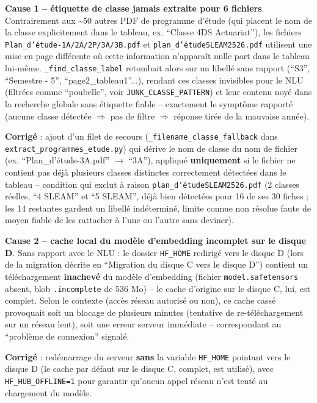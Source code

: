 \documentclass[11pt,a4paper]{report}
\begin{document}
\textbf{Cause 1 -- étiquette de classe jamais extraite pour 6 fichiers}.
Contrairement aux \textasciitilde50 autres PDF de programme d'étude (qui
placent le nom de la classe explicitement dans le tableau, ex. ``Classe 4DS
Actuariat''), les fichiers \texttt{Plan\_d'étude-1A/2A/2P/3A/3B.pdf} et
\texttt{plan\_d'étudeSLEAM2526.pdf} utilisent une mise en page différente où
cette information n'apparaît nulle part dans le tableau lui-même.
\texttt{\_find\_classe\_label} retombait alors sur un libellé sans rapport
(``S3'', ``Semestre - 5'', ``page2\_tableau1''...), rendant ces classes
invisibles pour le NLU (filtrées comme ``poubelle'', voir
\texttt{JUNK\_CLASSE\_PATTERN}) et leur contenu noyé dans la recherche globale
sans étiquette fiable -- exactement le symptôme rapporté (aucune classe
détectée $\Rightarrow$ pas de filtre $\Rightarrow$ réponse tirée de la mauvaise
année).

\textbf{Corrigé} : ajout d'un filet de secours
(\texttt{\_filename\_classe\_fallback} dans
\texttt{extract\_programmes\_etude.py}) qui dérive le nom de classe du nom de
fichier (ex. ``Plan\_d'étude-3A.pdf'' $\to$ ``3A''), appliqué \textbf{uniquement}
si le fichier ne contient pas déjà plusieurs classes distinctes correctement
détectées dans le tableau -- condition qui exclut à raison
\texttt{plan\_d'étudeSLEAM2526.pdf} (2 classes réelles, ``4 SLEAM'' et
``5 SLEAM'', déjà bien détectées pour 16 de ses 30 fiches ; les 14 restantes
gardent un libellé indéterminé, limite connue non résolue faute de moyen fiable
de les rattacher à l'une ou l'autre sans deviner).

\textbf{Cause 2 -- cache local du modèle d'embedding incomplet sur le disque D}.
Sans rapport avec le NLU : le dossier \texttt{HF\_HOME} redirigé vers le disque
D (lors de la migration décrite en
``Migration du disque C vers le disque D'') contient un téléchargement
\textbf{inachevé} du modèle d'embedding (fichier \texttt{model.safetensors}
absent, blob \texttt{.incomplete} de 536 Mo) -- le cache d'origine sur le
disque C, lui, est complet. Selon le contexte (accès réseau autorisé ou non),
ce cache cassé provoquait soit un blocage de plusieurs minutes (tentative de
re-téléchargement sur un réseau lent), soit une erreur serveur immédiate --
correspondant au ``problème de connexion'' signalé.

\textbf{Corrigé} : redémarrage du serveur \textbf{sans} la variable
\texttt{HF\_HOME} pointant vers le disque D (le cache par défaut sur le disque
C, complet, est utilisé), avec \texttt{HF\_HUB\_OFFLINE=1} pour garantir qu'aucun
appel réseau n'est tenté au chargement du modèle.
\end{document}
